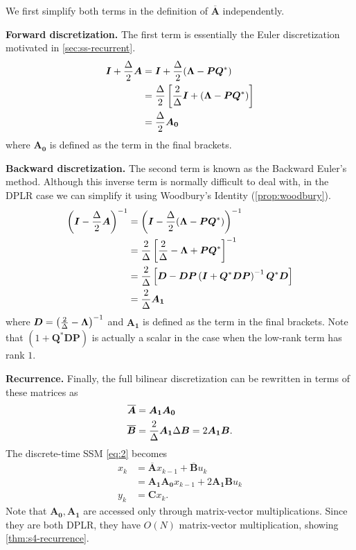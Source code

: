 We first simplify both terms in the definition of \( \bm{\overline{A}} \) independently.

\textbf{Forward discretization.}
The first term is essentially the Euler discretization motivated in \cref{sec:ss-recurrent}.
\begin{align*}
  \bm{I} + \frac{\Delta}{2} \bm{A}
  &= \bm{I} + \frac{\Delta}{2} (\bm{\Lambda} - \bm{P} \bm{Q}^*)
  \\&= \frac{\Delta}{2} \left[ \frac{2}{\Delta}\bm{I} + (\bm{\Lambda} - \bm{P} \bm{Q}^*) \right]
  \\&= \frac{\Delta}{2} \bm{A_0}
\end{align*}
where \( \bm{A_0} \) is defined as the term in the final brackets.

\textbf{Backward discretization.}
The second term is known as the Backward Euler's method.
Although this inverse term is normally difficult to deal with,
in the DPLR case we can simplify it using Woodbury's Identity (\cref{prop:woodbury}).
\begin{align*}
  \left( \bm{I} - \frac{\Delta}{2} \bm{A} \right)^{-1}
  &=
  \left( \bm{I} - \frac{\Delta}{2} (\bm{\Lambda} - \bm{P} \bm{Q}^*) \right)^{-1}
  \\&=
  \frac{2}{\Delta} \left[ \frac{2}{\Delta} - \bm{\Lambda} + \bm{P} \bm{Q}^* \right]^{-1}
  \\&=
  \frac{2}{\Delta} \left[ \bm{D} - \bm{D} \bm{P} \left( \bm{I} + \bm{Q}^* \bm{D} \bm{P} \right)^{-1} \bm{Q}^* \bm{D} \right]
  \\&= \frac{2}{\Delta} \bm{A_1}
\end{align*}
where \( \bm{D} = \left( \frac{2}{\Delta}-\bm{\Lambda} \right)^{-1} \)
and \( \bm{A_1} \) is defined as the term in the final brackets.
Note that
\( \left( 1 + \bm{Q}^* \bm{D} \bm{P} \right) \)
is actually a scalar in the case when the low-rank term has rank \( 1 \).


\textbf{\methodabbrv{} Recurrence.}
Finally, the full bilinear discretization can be rewritten in terms of these matrices as
\begin{align*}
  \bm{\overline{A}} &= \bm{A_1} \bm{A_0} \\
  \bm{\overline{B}} &= \frac{2}{\Delta} \bm{A_1} \Delta \bm{B} = 2 \bm{A_1} \bm{B}
  .
\end{align*}
The discrete-time SSM \eqref{eq:2} becomes
\begin{align*}
  x_{k} &= \bm{\overline{A}} x_{k-1} + \bm{\overline{B}} u_k \\
  &= \bm{A_1} \bm{A_0} x_{k-1} + 2 \bm{A_1} \bm{B} u_k \\
  y_k &= \bm{C} x_k
  .
\end{align*}
Note that \( \bm{A_0}, \bm{A_1} \) are accessed only through matrix-vector multiplications.
Since they are both DPLR, they have \( O(N) \) matrix-vector multiplication,
showing \cref{thm:s4-recurrence}.



